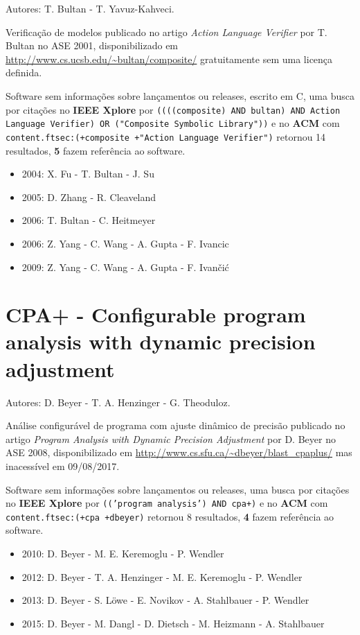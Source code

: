 Autores:
T. Bultan - T. Yavuz-Kahveci.

Verificação de modelos
publicado no artigo {\it Action Language Verifier}
por T. Bultan
no ASE 2001,
disponibilizado em \url{http://www.cs.ucsb.edu/~bultan/composite/}
gratuitamente
sem uma licença definida.

Software sem informações sobre lançamentos ou releases,
escrito em C,
uma busca por citações no {\bf IEEE Xplore} por
\texttt{((((composite) AND bultan) AND Action Language Verifier) OR ("Composite Symbolic Library"))}
e no {\bf ACM} com
\texttt{content.ftsec:(+composite +"Action Language Verifier")}
retornou
14 resultados,
{\bf 5} fazem referência ao software.

\begin{itemize}
\item 2004: X. Fu - T. Bultan - J. Su
\item 2005: D. Zhang - R. Cleaveland
\item 2006: T. Bultan - C. Heitmeyer
\item 2006: Z. Yang - C. Wang - A. Gupta - F. Ivancic
\item 2009: Z. Yang - C. Wang - A. Gupta - F. Ivan\v{c}i\'{c}
\end{itemize}

\section{CPA+ - Configurable program analysis with dynamic precision adjustment}

Autores:
D. Beyer - T. A. Henzinger - G. Theoduloz.

Análise configurável de programa com ajuste dinâmico de precisão
publicado no artigo {\it Program Analysis with Dynamic Precision Adjustment}
por D. Beyer
no ASE 2008,
disponibilizado em \url{http://www.cs.sfu.ca/~dbeyer/blast_cpaplus/}
mas inacessível em 09/08/2017.

Software sem informações sobre lançamentos ou releases,
uma busca por citações no {\bf IEEE Xplore} por
\texttt{(('program analysis') AND cpa+)}
e no {\bf ACM} com
\texttt{content.ftsec:(+cpa +dbeyer)}
retornou
8 resultados,
{\bf 4} fazem referência ao software.

\begin{itemize}
\item 2010: D. Beyer - M. E. Keremoglu - P. Wendler
\item 2012: D. Beyer - T. A. Henzinger - M. E. Keremoglu - P. Wendler
\item 2013: D. Beyer - S. L\"{o}we - E. Novikov - A. Stahlbauer - P. Wendler
\item 2015: D. Beyer - M. Dangl - D. Dietsch - M. Heizmann - A. Stahlbauer
\end{itemize}

